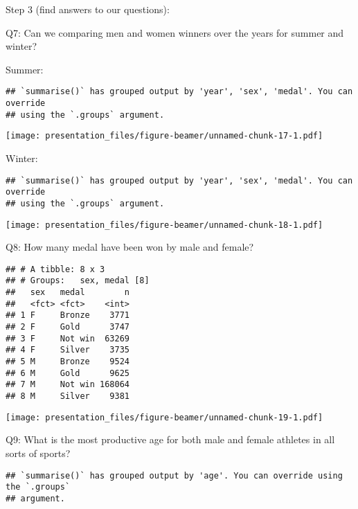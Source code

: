 \documentclass[
  ignorenonframetext,
]{beamer}
\begin{document}
\begin{frame}[fragile]{Step 3 (find answers to our questions):}
\begin{block}{Q7: Can we comparing men and women winners over the years
for summer and winter?}
\protect\hypertarget{q7-can-we-comparing-men-and-women-winners-over-the-years-for-summer-and-winter}{}
\begin{block}{Summer:}
\protect\hypertarget{summer}{}
\begin{verbatim}
## `summarise()` has grouped output by 'year', 'sex', 'medal'. You can override
## using the `.groups` argument.
\end{verbatim}

\texttt{[image: presentation\_files/figure-beamer/unnamed-chunk-17-1.pdf]}
\end{block}

\begin{block}{Winter:}
\protect\hypertarget{winter}{}
\begin{verbatim}
## `summarise()` has grouped output by 'year', 'sex', 'medal'. You can override
## using the `.groups` argument.
\end{verbatim}

\texttt{[image: presentation\_files/figure-beamer/unnamed-chunk-18-1.pdf]}
\end{block}
\end{block}

\begin{block}{Q8: How many medal have been won by male and female?}
\protect\hypertarget{q8-how-many-medal-have-been-won-by-male-and-female}{}
\begin{verbatim}
## # A tibble: 8 x 3
## # Groups:   sex, medal [8]
##   sex   medal        n
##   <fct> <fct>    <int>
## 1 F     Bronze    3771
## 2 F     Gold      3747
## 3 F     Not win  63269
## 4 F     Silver    3735
## 5 M     Bronze    9524
## 6 M     Gold      9625
## 7 M     Not win 168064
## 8 M     Silver    9381
\end{verbatim}

\texttt{[image: presentation\_files/figure-beamer/unnamed-chunk-19-1.pdf]}
\end{block}

\begin{block}{Q9: What is the most productive age for both male and
female athletes in all sorts of sports?}
\protect\hypertarget{q9-what-is-the-most-productive-age-for-both-male-and-female-athletes-in-all-sorts-of-sports}{}
\begin{verbatim}
## `summarise()` has grouped output by 'age'. You can override using the `.groups`
## argument.
\end{verbatim}


\end{block}
\end{frame}
\end{document}
